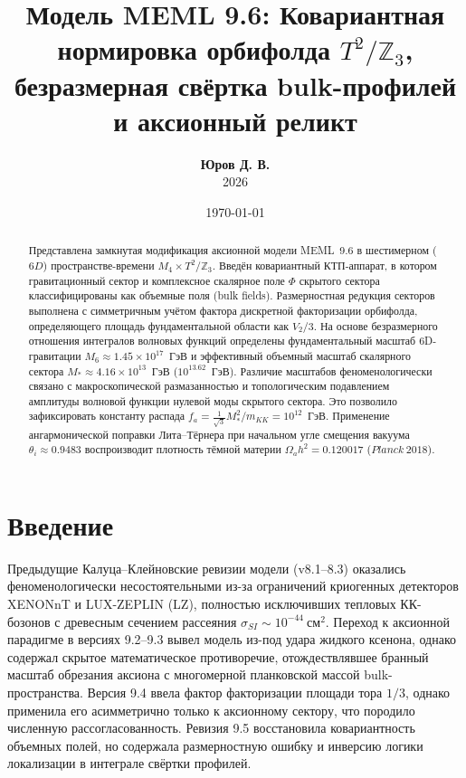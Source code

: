 \documentclass[12pt,a4paper]{article}
\title{\textbf{Модель MEML 9.6: Ковариантная нормировка орбифолда $T^2/\mathbb{Z}_3$,\\
безразмерная свёртка bulk-профилей и аксионный реликт}}
\author{\textbf{Юров Д. В.}\\2026}
\date{\today}
\begin{document}
\maketitle

\begin{abstract}
Представлена замкнутая модификация аксионной модели MEML~9.6 в шестимерном ($6D$) пространстве-времени $M_4 \times T^2/\mathbb{Z}_3$. Введён ковариантный КТП-аппарат, в котором гравитационный сектор и комплексное скалярное поле $\Phi$ скрытого сектора классифицированы как объемные поля (bulk fields). Размерностная редукция секторов выполнена с симметричным учётом фактора дискретной факторизации орбифолда, определяющего площадь фундаментальной области как $V_2/3$. На основе безразмерного отношения интегралов волновых функций определены фундаментальный масштаб 6D-гравитации $M_6 \approx 1.45 \times 10^{17}$~ГэВ и эффективный объемный масштаб скалярного сектора $M_* \approx 4.16 \times 10^{13}$~ГэВ ($10^{13.62}$~ГэВ). Различие масштабов феноменологически связано с макроскопической размазанностью и топологическим подавлением амплитуды волновой функции нулевой моды скрытого сектора. Это позволило зафиксировать константу распада $f_a = \frac{1}{\sqrt{3}}M_*^2/m_{KK} = 10^{12}$~ГэВ. Применение ангармонической поправки Лита--Тёрнера при начальном угле смещения вакуума $\theta_i \approx 0.9483$ воспроизводит плотность тёмной материи $\Omega_a h^2 = 0.120017$ ($Planck \ 2018$).
\end{abstract}

\section{Введение}
Предыдущие Калуца--Клейновские ревизии модели (v8.1--8.3) оказались феноменологически несостоятельными из-за ограничений криогенных детекторов XENONnT и LUX-ZEPLIN (LZ), полностью исключивших тепловых КК-бозонов с древесным сечением рассеяния $\sigma_{SI} \sim 10^{-44} \ \text{см}^2$. Переход к аксионной парадигме в версиях 9.2--9.3 вывел модель из-под удара жидкого ксенона, однако содержал скрытое математическое противоречие, отождествлявшее бранный масштаб обрезания аксиона с многомерной планковской массой bulk-пространства. Версия 9.4 ввела фактор факторизации площади тора $1/3$, однако применила его асимметрично только к аксионному сектору, что породило численную рассогласованность. Ревизия 9.5 восстановила ковариантность объемных полей, но содержала размерностную ошибку и инверсию логики локализации в интеграле свёртки профилей.
\end{document}
